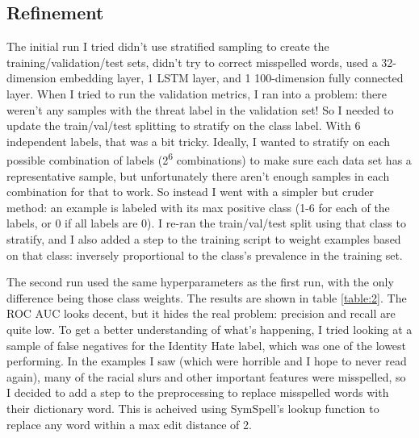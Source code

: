 \documentclass[12pt]{article}
\begin{document}
\subsection*{Refinement}
\label{sec:org7d811ea}
The initial run I tried didn't use stratified sampling to create the training/validation/test sets, didn't try to correct misspelled words, used a 32-dimension embedding layer, 1 LSTM layer, and 1 100-dimension fully connected layer. When I tried to run the validation metrics, I ran into a problem: there weren't any samples with the threat label in the validation set! So I needed to update the train/val/test splitting to stratify on the class label. With 6 independent labels, that was a bit tricky. Ideally, I wanted to stratify on each possible combination of labels (2\textsuperscript{6} combinations) to make sure each data set has a representative sample, but unfortunately there aren't enough samples in each combination for that to work. So instead I went with a simpler but cruder method: an example is labeled with its max positive class (1-6 for each of the labels, or 0 if all labels are 0). I re-ran the train/val/test split using that class to stratify, and I also added a step to the training script to weight examples based on that class: inversely proportional to the class's prevalence in the training set.

The second run used the same hyperparameters as the first run, with the only difference being those class weights. The results are shown in table \ref{table:2}. The ROC AUC looks decent, but it hides the real problem: precision and recall are quite low. To get a better understanding of what's happening, I tried looking at a sample of false negatives for the Identity Hate label, which was one of the lowest performing. In the examples I saw (which were horrible and I hope to never read again), many of the racial slurs and other important features were misspelled, so I decided to add a step to the preprocessing to replace misspelled words with their dictionary word. This is acheived using SymSpell's lookup function to replace any word within a max edit distance of 2.
\end{document}

